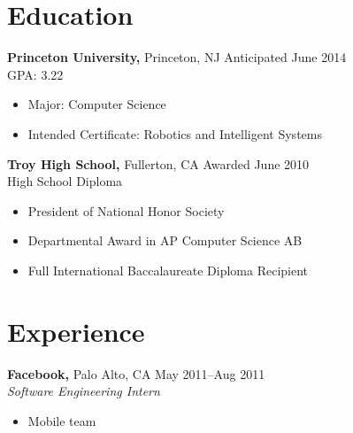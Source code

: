 \documentclass[margin]{res}
\begin{document}
 
 

\address{{\bf Present Address} \\ 3169 Frist Center \\ Princeton, NJ
  08544 \\ (714) 869-7503 \\ dan@dskang.com }

\address{{\bf Permanent Address} \\ 2507 Cypress Point Drive \\
  Fullerton, CA 92833 }

 
\begin{resume} 
 
\section{Education} 
 {\bf Princeton University,} Princeton, NJ \hfill Anticipated June
 2014 \\ GPA: 3.22
 \begin{itemize} \itemsep -2pt %
 \item Major: Computer Science
 \item Intended Certificate: Robotics and Intelligent Systems
 \end{itemize}

 {\bf Troy High School,} Fullerton, CA \hfill Awarded June 2010 \\
 High School Diploma
 \begin{itemize} \itemsep -2pt %
 \item President of National Honor Society
 \item Departmental Award in AP Computer Science AB
 \item Full International Baccalaureate Diploma Recipient
 \end{itemize}



\section{Experience}
 {\bf Facebook,} Palo Alto, CA \hfill May 2011--Aug 2011 \\
 {\it Software Engineering Intern}
 \begin{itemize} \itemsep -2pt  %
 \item Mobile team
 \end{itemize}


\end{resume}
\end{document}
